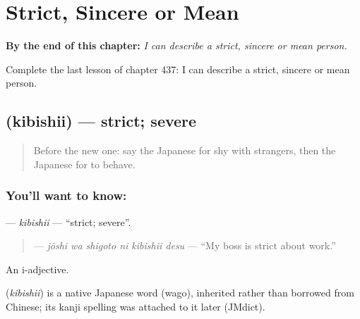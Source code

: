 
\chapter{Strict, Sincere or Mean}
\label{ch:ja-strict-sincere-or-mean}

\begin{chapteropening}
\textbf{By the end of this chapter:} \emph{I can describe a strict, sincere or mean person.}

Complete the last lesson of chapter 437: I can describe a strict, sincere or mean person.
\end{chapteropening}

\section[\texorpdfstring{\ja{きびしい} (kibishii)}{きびしい (kibishii)}]{ (kibishii) — strict; severe}

\label{lesson:JA-C437-kibishii}



\begin{quote}
Before the new one: say the Japanese for shy with strangers, then the Japanese for to behave.
\end{quote}

\subsection*{You'll want to know: }
\textbf{} — \emph{kibishii} — \textquotedblleft{}strict; severe\textquotedblright{}.

\begin{quote}
\textbf{  } — \emph{jōshi wa shigoto ni kibishii desu} — \textquotedblleft{}My boss is strict about work.\textquotedblright{}
\end{quote}

An i-adjective.

\begin{cousinweb}
\textbf{} (\emph{kibishii}) is a native Japanese word (wago), inherited rather than borrowed from Chinese; its kanji spelling was attached to it later (JMdict).
\end{cousinweb}

